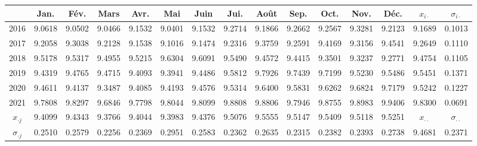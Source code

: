 \begin{tabular}{ccccccccccccccc}
    \toprule
        & Jan. & Fév. & Mars & Avr. & Mai & Juin & Jui. & Août & Sep. & Oct. & Nov. & Déc. & $x_{i\cdot}$ & $\sigma_{i\cdot}$ \\
    \midrule
        2016 & 9.0618 & 9.0502 & 9.0466 & 9.1532 & 9.0401 & 9.1532 & 9.2714 & 9.1866 & 9.2662 & 9.2567 & 9.3281 & 9.2123 & 9.1689 & 0.1013 \\ 
        2017 & 9.2058 & 9.3038 & 9.2128 & 9.1538 & 9.1016 & 9.1474 & 9.2316 & 9.3759 & 9.2591 & 9.4169 & 9.3156 & 9.4541 & 9.2649 & 0.1110 \\ 
        2018 & 9.5178 & 9.5317 & 9.4955 & 9.5215 & 9.6304 & 9.6091 & 9.5490 & 9.4572 & 9.4415 & 9.3501 & 9.3237 & 9.2771 & 9.4754 & 0.1105 \\ 
        2019 & 9.4319 & 9.4765 & 9.4715 & 9.4093 & 9.3941 & 9.4486 & 9.5812 & 9.7926 & 9.7439 & 9.7199 & 9.5230 & 9.5486 & 9.5451 & 0.1371 \\ 
        2020 & 9.4611 & 9.4137 & 9.3487 & 9.4085 & 9.4193 & 9.4576 & 9.5314 & 9.6400 & 9.5831 & 9.6262 & 9.6824 & 9.7179 & 9.5242 & 0.1227 \\ 
        2021 & 9.7808 & 9.8297 & 9.6846 & 9.7798 & 9.8044 & 9.8099 & 9.8808 & 9.8806 & 9.7946 & 9.8755 & 9.8983 & 9.9406 & 9.8300 & 0.0691 \\ 
    \midrule
        $x_{\cdot j}$ & 9.4099 & 9.4343 & 9.3766 & 9.4044 & 9.3983 & 9.4376 & 9.5076 & 9.5555 & 9.5147 & 9.5409 & 9.5118 & 9.5251 & $x_{\cdot\cdot}$ & $\sigma_{\cdot\cdot}$ \\ 
        $\sigma_{\cdot j}$ & 0.2510 & 0.2579 & 0.2256 & 0.2369 & 0.2951 & 0.2583 & 0.2362 & 0.2635 & 0.2315 & 0.2382 & 0.2393 & 0.2738 & 9.4681 & 0.2371 \\
    \bottomrule 
\end{tabular}
